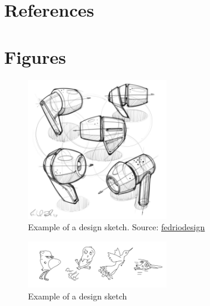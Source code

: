 \documentclass{article}
\begin{document}



\pagebreak
\section*{References}





\appendix 
\section{Figures}
\begin{figure}[h]
	\centering
	\includegraphics[width=0.55\textwidth]{img/sketch.jpeg}
	\caption{Example of a design sketch. Source: \href{https://fedriosdesign.com/design-sketching}{fedriodesign}}
	\label{fig:designsketch}
\end{figure}
\begin{figure}[h]
	\centering
	\includegraphics[width=0.55\textwidth]{img/doodlergan1.png}
	\caption{Example of a design sketch}
	\label{fig:doodlergan}
\end{figure}
\end{document}
